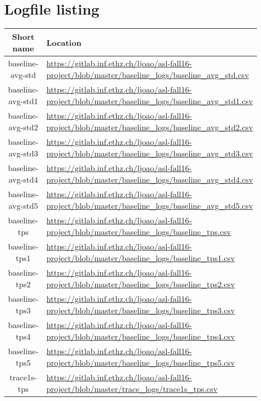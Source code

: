\documentclass[11pt]{article}
\begin{document}
\pagebreak

\section*{Logfile listing}

\begin{tabular}{|c|l|}
\hline \textbf{Short name }& \textbf{Location} \\ 
\hline baseline-avg-std& \url{https://gitlab.inf.ethz.ch/ljoao/asl-fall16-project/blob/master/baseline_logs/baseline_avg_std.csv}\\ 
\hline baseline-avg-std1 & \url{https://gitlab.inf.ethz.ch/ljoao/asl-fall16-project/blob/master/baseline_logs/baseline_avg_std1.csv} \\ 
\hline baseline-avg-std2 & \url{https://gitlab.inf.ethz.ch/ljoao/asl-fall16-project/blob/master/baseline_logs/baseline_avg_std2.csv} \\ 
\hline baseline-avg-std3 & \url{https://gitlab.inf.ethz.ch/ljoao/asl-fall16-project/blob/master/baseline_logs/baseline_avg_std3.csv} \\ 
\hline baseline-avg-std4 & \url{https://gitlab.inf.ethz.ch/ljoao/asl-fall16-project/blob/master/baseline_logs/baseline_avg_std4.csv} \\ 
\hline baseline-avg-std5 & \url{https://gitlab.inf.ethz.ch/ljoao/asl-fall16-project/blob/master/baseline_logs/baseline_avg_std5.csv} \\ 
\hline baseline-tps & \url{https://gitlab.inf.ethz.ch/ljoao/asl-fall16-project/blob/master/baseline_logs/baseline_tps.csv} \\ 
\hline baseline-tps1 & \url{https://gitlab.inf.ethz.ch/ljoao/asl-fall16-project/blob/master/baseline_logs/baseline_tps1.csv} \\ 
\hline baseline-tps2 & \url{https://gitlab.inf.ethz.ch/ljoao/asl-fall16-project/blob/master/baseline_logs/baseline_tps2.csv} \\ 
\hline baseline-tps3 & \url{https://gitlab.inf.ethz.ch/ljoao/asl-fall16-project/blob/master/baseline_logs/baseline_tps3.csv} \\ 
\hline baseline-tps4 & \url{https://gitlab.inf.ethz.ch/ljoao/asl-fall16-project/blob/master/baseline_logs/baseline_tps4.csv} \\ 
\hline baseline-tps5 & \url{https://gitlab.inf.ethz.ch/ljoao/asl-fall16-project/blob/master/baseline_logs/baseline_tps5.csv} \\ 
\hline trace1s-tps & \url{https://gitlab.inf.ethz.ch/ljoao/asl-fall16-project/blob/master/trace_logs/trace1s_tps.csv} \\ 

\end{tabular}
\end{document}
